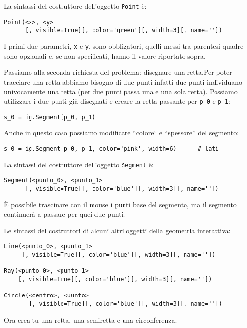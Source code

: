 La sintassi del costruttore dell'oggetto \texttt{Point} è:

\begin{lstlisting}
Point(<x>, <y>
      [, visible=True][, color='green'][, width=3][, name=''])
\end{lstlisting}

I primi due parametri, \texttt{x} e \texttt{y}, sono obbligatori, quelli messi 
tra parentesi quadre sono opzionali e, se non specificati, hanno il valore
riportato sopra.

Passiamo alla seconda richiesta del problema: disegnare una retta.Per poter
tracciare una retta abbiamo bisogno di due punti infatti due punti individuano
univocamente una retta (per due punti passa una e una sola retta).
Possiamo utilizzare i due punti già disegnati e creare la retta passante per
\texttt{p\_0} e \texttt{p\_1}:

\begin{lstlisting}
s_0 = ig.Segment(p_0, p_1)
\end{lstlisting}

Anche in questo caso possiamo modificare ``colore'' e ``spessore'' del 
segmento:

\begin{lstlisting}
s_0 = ig.Segment(p_0, p_1, color='pink', width=6)      # lati
\end{lstlisting}

La sintassi del costruttore dell'oggetto \texttt{Segment} è:

\begin{lstlisting}
Segment(<punto_0>, <punto_1>
      [, visible=True][, color='blue'][, width=3][, name=''])
\end{lstlisting}

È possibile trascinare con il mouse i punti base del segmento, ma il segmento
continuerà a passare per quei due punti.

Le sintassi dei costruttori di alcuni altri oggetti della geometria interattiva:

\begin{lstlisting}
Line(<punto_0>, <punto_1>
     [, visible=True][, color='blue'][, width=3][, name=''])
    
Ray(<punto_0>, <punto_1>
    [, visible=True][, color='blue'][, width=3][, name=''])

Circle(<centro>, <uunto>
       [, visible=True][, color='blue'][, width=3][, name=''])
\end{lstlisting}

Ora crea tu una retta, una semiretta e una circonferenza.

